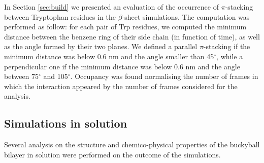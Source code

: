 In Section \ref{sec:build} we presented an evaluation of the occurrence of $\pi$-stacking between Tryptophan residues in the $\beta$-sheet simulations. The computation was performed as follow: for each pair of Trp residues, we computed the minimum distance between the benzene ring of their side chain (in function of time), as well as the angle formed by their two planes. We defined a parallel $\pi$-stacking if the minimum distance was below 0.6 nm and the angle smaller than 45$^{\circ}$, while a perpendicular one if the minimum distance was below 0.6 nm and the angle between 75$^{\circ}$ and 105$^{\circ}$. Occupancy was found normalising the number of frames in which the interaction appeared by the number of frames considered for the analysis.    
    
\subsection{Simulations in solution}
Several analysis on the structure and chemico-physical properties of the buckyball bilayer in solution were performed on the outcome of the simulations.


